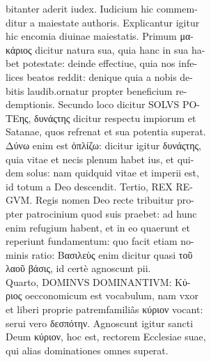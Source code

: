 \documentclass{article}
\begin{document}
\begin{pages}
                bitanter aderit iudex. Iudicium hic commem- \\
                ditur a maiestate authoris. Explicantur igitur \\
                hic encomia diuinae maiestatis. Primum μα- \\
                κάριος dicitur natura sua, quia hanc in sua ha- \\
                bet potestate: deinde effectiue, quia nos infe- \\
                lices beatos reddit: denique quia a nobis de- \\
                bitis laudib.ornatur propter beneficium re- \\
                demptionis. Secundo loco dicitur SOLVS PO- \\
                ΤEης, δυνάςτης dicitur respectu impiorum et \\
                Satanae, quos refrenat et sua potentia superat. \\
                Δύνω enim est ὁπλίζω: dicitur igitur δυνάςτης, \\
                quia vitae et necis plenum habet ius, et qui- \\
                dem solus: nam quidquid vitae et imperii est, \\
                id totum a Deo descendit. Tertio, REX RE- \\
                GVM. Regis nomen Deo recte tribuitur pro- \\
                pter patrocinium quod suis praebet: ad hunc \\
                enim refugium habent, et in eo quaerunt et \\
                reperiunt fundamentum: quo facit etiam no- \\
                minis ratio: Βασιλεὺς enim dicitur quasi τοῦ \\
                λαοῦ βάσις, id certè agnoscunt pii. \\
                Quarto, DOMINVS DOMINANTIVM: Κύ- \\
                ριος oecconomicum est vocabulum, nam vxor \\
                et liberi proprie patremfamiliâs κύριον vocant: \\
                serui vero δεσπότην. Agnoscunt igitur sancti \\
                Deum κύριον, hoc est, rectorem Ecclesiae suae, \\
                qui alias dominationes omnes superat. \\

\end{pages}
\end{document}
